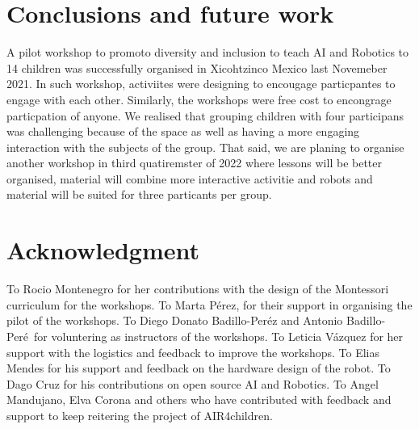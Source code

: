 \documentclass[conference]{IEEEtran}
\begin{document}
\section{Conclusions and future work}
A pilot workshop to promoto diversity and inclusion to teach AI and Robotics to 14 children was successfully organised in Xicohtzinco Mexico last Novemeber 2021.
In such workshop, activiites were designing to encougage particpantes to engage with each other. 
Similarly, the workshops were free cost to encongrage particpation of anyone. 
We realised that grouping children with four participans was challenging because of the space as well as having a more engaging interaction with the subjects of the group. 
That said, we are planing to organise another workshop in third quatiremster of 2022 where lessons will be better organised, material will combine more interactive activitie and robots and material will be suited for three particants per group. 

\section*{Acknowledgment}
To Rocio Montenegro for her contributions with the design of the Montessori curriculum for the workshops.
To Marta P\'erez, for their support in organising the pilot of the workshops.
To Diego Donato Badillo-Per\'ez and Antonio Badillo-Per\'e\ for voluntering as instructors of the workshops.
To Leticia V\'azquez for her support with the logistics and feedback to improve the workshops.
To Elias Mendes for his support and feedback on the hardware design of the robot.
To Dago Cruz for his contributions on open source AI and Robotics.
To Angel Mandujano, Elva Corona and others who have contributed with feedback and support to keep reitering the project of AIR4children. 



\end{document}
